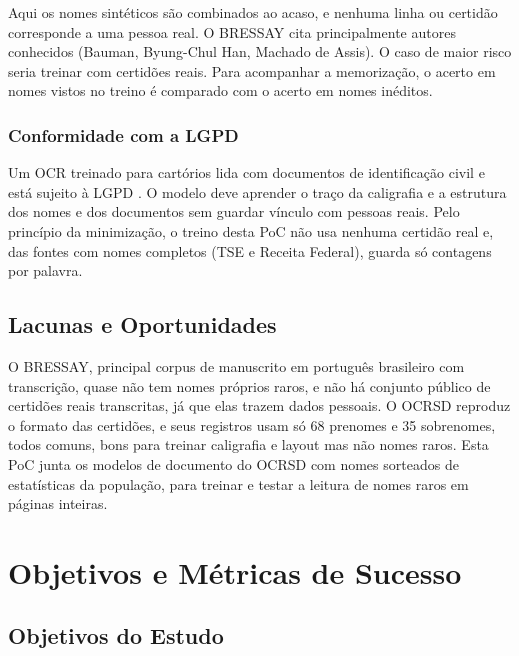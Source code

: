 Aqui os nomes sintéticos são combinados ao acaso, e nenhuma linha ou certidão corresponde a uma pessoa real. O BRESSAY cita principalmente autores conhecidos (Bauman, Byung-Chul Han, Machado de Assis). O caso de maior risco seria treinar com certidões reais. Para acompanhar a memorização, o acerto em nomes vistos no treino é comparado com o acerto em nomes inéditos.

\subsubsection{Conformidade com a LGPD}
Um OCR treinado para cartórios lida com documentos de identificação civil e está sujeito à LGPD \cite{lgpd2018}. O modelo deve aprender o traço da caligrafia e a estrutura dos nomes e dos documentos sem guardar vínculo com pessoas reais. Pelo princípio da minimização, o treino desta PoC não usa nenhuma certidão real e, das fontes com nomes completos (TSE e Receita Federal), guarda só contagens por palavra.

\subsection{Lacunas e Oportunidades}

O BRESSAY, principal corpus de manuscrito em português brasileiro com transcrição, quase não tem nomes próprios raros, e não há conjunto público de certidões reais transcritas, já que elas trazem dados pessoais. O OCRSD reproduz o formato das certidões, e seus registros usam só 68 prenomes e 35 sobrenomes, todos comuns, bons para treinar caligrafia e layout mas não nomes raros. Esta PoC junta os modelos de documento do OCRSD com nomes sorteados de estatísticas da população, para treinar e testar a leitura de nomes raros em páginas inteiras.

\section{Objetivos e Métricas de Sucesso}
\label{sec:objetivos}

\subsection{Objetivos do Estudo}

